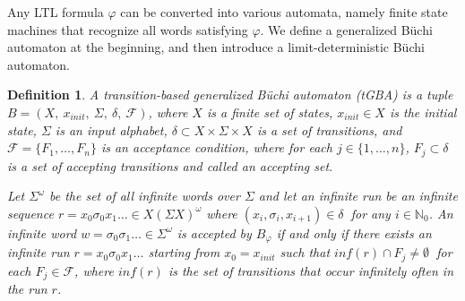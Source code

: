 \documentclass[letterpaper, 10 pt, conference]{ieeeconf}  %
\newtheorem{definition}{Definition}
\begin{document}
Any LTL formula $\varphi$ can be converted into various automata, namely finite state machines that recognize %
all words satisfying $\varphi$.
 We define a generalized B\"{u}chi automaton at the beginning, and then introduce a limit-deterministic B\"{u}chi automaton.

\begin{definition}
  A transition-based generalized B\"{u}chi automaton (tGBA) is a tuple $B = (X,\ x_{init},\ \Sigma,\ \delta,\ \mathcal{F})$, where $X$ is a finite set of states, $x_{init} \in X$ is the initial state, $\Sigma$ is an input alphabet, $\delta \subset  X\times \Sigma \times X$ is a set of transitions, and $\mathcal{F} = \{F_1,\ldots,F_n\}$ is an acceptance condition, where for each $ j \in \{1,\ldots,n\}$, $F_j \subset \delta$ is a set of accepting transitions and called an accepting set.

  Let $\Sigma^{\omega}$ be the set of all infinite words over $\Sigma$ and let an infinite run be an infinite sequence $r = x_0\sigma_0x_1 \ldots \in X (\Sigma X)^{\omega}$ where $(x_i, \sigma_{i}, x_{i+1}) \in \delta\ $ for any $ i\in \mathbb{N}_0$. An infinite word $w = \sigma_0\sigma_1 \ldots \in \Sigma^{\omega}$ is accepted by $B_{\varphi}$ if and only if there exists an infinite run $r = x_0 \sigma_0 x_1 \ldots$ starting from $x_0 = x_{init}$ such that $inf(r) \cap F_j \neq \emptyset\ $ for each $F_j \in \mathcal{F}$, where $inf(r)$ is the set of transitions that occur infinitely often in the run $r$.
\end{definition}
\end{document}
